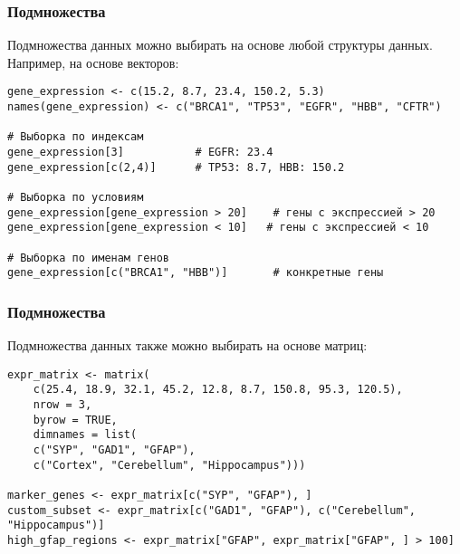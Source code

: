 \documentclass[14pt,a4paper]{beamer}
\begin{document}
	
	\begin{frame}[fragile]
		\frametitle{Подмножества}
		Подмножества данных можно выбирать на основе любой структуры данных. Например, на основе векторов:
		{\fontsize{8}{9}\selectfont
			
			
				\begin{verbatim}
gene_expression <- c(15.2, 8.7, 23.4, 150.2, 5.3)
names(gene_expression) <- c("BRCA1", "TP53", "EGFR", "HBB", "CFTR")
					
# Выборка по индексам
gene_expression[3]           # EGFR: 23.4
gene_expression[c(2,4)]      # TP53: 8.7, HBB: 150.2
					
# Выборка по условиям
gene_expression[gene_expression > 20]    # гены с экспрессией > 20
gene_expression[gene_expression < 10]   # гены с экспрессией < 10
					
# Выборка по именам генов
gene_expression[c("BRCA1", "HBB")]       # конкретные гены\end{verbatim}
			
}
		
		
	\end{frame}
	
	\begin{frame}[fragile]
		\frametitle{Подмножества}
		Подмножества данных также можно выбирать на основе матриц:
		{\fontsize{8}{9}\selectfont
			
				\begin{verbatim}
expr_matrix <- matrix(
    c(25.4, 18.9, 32.1, 45.2, 12.8, 8.7, 150.8, 95.3, 120.5), 
    nrow = 3,
    byrow = TRUE,
    dimnames = list(
    c("SYP", "GAD1", "GFAP"), 
    c("Cortex", "Cerebellum", "Hippocampus")))
					
marker_genes <- expr_matrix[c("SYP", "GFAP"), ]
custom_subset <- expr_matrix[c("GAD1", "GFAP"), c("Cerebellum", "Hippocampus")]
high_gfap_regions <- expr_matrix["GFAP", expr_matrix["GFAP", ] > 100]          
					
				\end{verbatim}
		}
		
		
	\end{frame}
	
\end{document}
